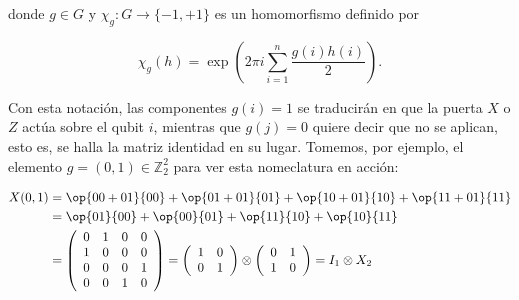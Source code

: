 \documentclass[11pt,a4paper,twoside,pdf]{article}
\numberwithin{equation}{section}
\begin{document}
	donde $g \in G$ y $\chi_g : G \longrightarrow \{-1,+1\}$ es un homomorfismo  definido por
	
		\begin{equation}\label{eq: character function}
			\chi_g(h) = \exp\left( 2\pi i \displaystyle\sum_{i=1}^n \frac{g(i)h(i)}{2}\right) . 
		\end{equation}
	
	Con esta notación, las componentes $g(i)=1$ se traducirán en que la puerta $X$ o $Z$ actúa sobre el qubit $i$, mientras que $g(j)=0$ quiere decir que no se aplican, esto es, se halla la matriz identidad en su lugar. Tomemos, por ejemplo, el elemento $g=(0,1)\in \mathbb{Z}_2^2$ para ver esta nomeclatura en acción:
	
		\begin{equation*}
			\begin{aligned}
			X(0,1) &= \op{00+01}{00} + \op{01+01}{01} +\op{10+01}{10} + \op{11+01}{11} \\ 
						&= \op{01}{00} + \op{00}{01} + \op{11}{10} + \op{10}{11} \\
						&= \left(\begin{array}{cccc}
									0 & 1 & 0 & 0\\
									1 & 0 & 0 & 0\\
									0 & 0 & 0 & 1\\
									0 & 0 & 1 & 0
								\end{array}\right)	
							= \left(\begin{array}{cc} 1 & 0 \\ 0 & 1	\end{array}\right) \otimes
								\left(\begin{array}{cc} 0 & 1 \\ 1 & 0	\end{array}\right) = I_1 \otimes X_2 \\	
			\end{aligned}						
		\end{equation*}
	
\end{document}
